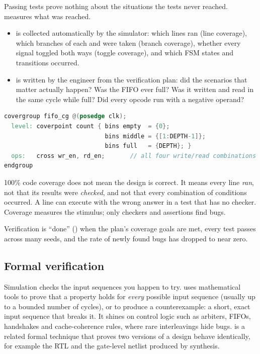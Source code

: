 Passing tests prove nothing about the situations the tests never reached.  measures what was reached.
\begin{itemize}
  \item {} is collected automatically by the simulator: which lines ran (line coverage), which branches of each  and  were taken (branch coverage), whether every signal toggled both ways (toggle coverage), and which FSM states and transitions occurred.
  \item {} is written by the engineer from the verification plan: did the scenarios that matter actually happen? Was the FIFO ever full? Was it written and read in the same cycle while full? Did every opcode run with a negative operand?
\end{itemize}

\begin{lstlisting}[language=Verilog]
covergroup fifo_cg @(posedge clk);
  level: coverpoint count { bins empty  = {0};
                            bins middle = {[1:DEPTH-1]};
                            bins full   = {DEPTH}; }
  ops:   cross wr_en, rd_en;       // all four write/read combinations
endgroup
\end{lstlisting}

\begin{trap}
100\% code coverage does not mean the design is correct. It means every line \emph{ran}, not that its results were \emph{checked}, and not that every combination of conditions occurred. A line can execute with the wrong answer in a test that has no checker. Coverage measures the stimulus; only checkers and assertions find bugs.
\end{trap}

Verification is ``done'' () when the plan's coverage goals are met, every test passes across many seeds, and the rate of newly found bugs has dropped to near zero.

\subsection*{Formal verification}

Simulation checks the input sequences you happen to try.  uses mathematical tools to prove that a property holds for \emph{every} possible input sequence (usually up to a bounded number of cycles), or to produce a counterexample: a short, exact input sequence that breaks it. It shines on control logic such as arbiters, FIFOs, handshakes and cache-coherence rules, where rare interleavings hide bugs.  is a related formal technique that proves two versions of a design behave identically, for example the RTL and the gate-level netlist produced by synthesis.


